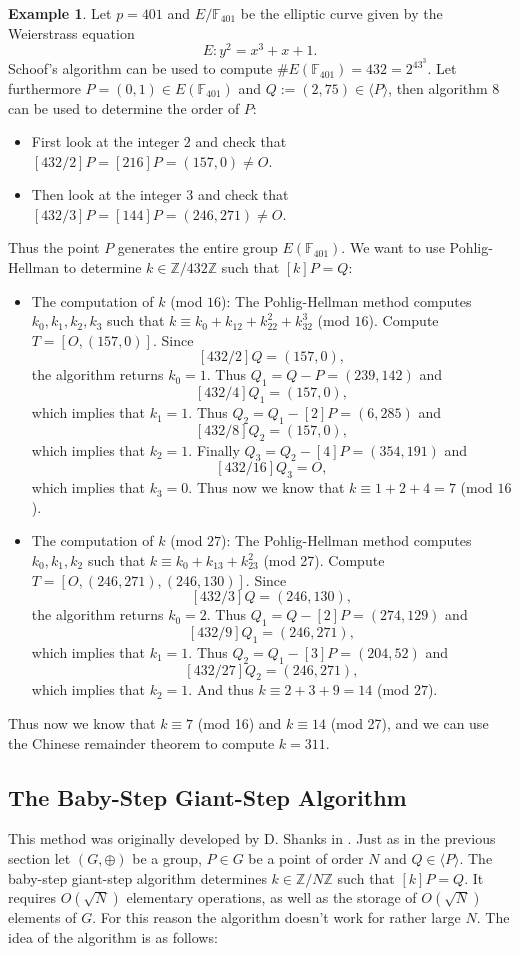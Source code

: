 \documentclass{article}
\numberwithin{equation}{section}
\theoremstyle{definition}
\newtheorem{example}[theorem]{Example}
\newcommand{\ZZ}{{\mathbb Z}} %
\newcommand{\Zmod}[1]{\ZZ / #1\ZZ} %
\newcommand{\FF}[1]{{\mathbb F}_{#1}} %
\newcommand{\grgen}[1]{\langle #1 \rangle} %
\begin{document}
\begin{example}
Let $p=401$ and $E/\FF{401}$ be the elliptic curve given by the Weierstrass equation $$E:y^2=x^3+x+1.$$ Schoof's algorithm can be used to compute $\#E(\FF{401}) = 432=2^43^3.$ Let furthermore $P=(0,1) \in E(\FF{401})$ and $Q:=(2,75) \in \grgen{P}$, then algorithm 8 can be used to determine the order of $P$:
\begin{itemize}
\item First look at the integer $2$ and check that $[432/2]P=[216]P=(157,0) \neq O$. 
\item Then look at the integer $3$ and check that $[432/3]P=[144]P=(246,271) \neq O$.
\end{itemize} 
Thus the point $P$ generates the entire group $E(\FF{401})$. We want to use Pohlig-Hellman to determine $k \in \Zmod{432}$ such that $[k]P=Q$: 
\begin{itemize}
\item The computation of $k$ (mod $16$): The Pohlig-Hellman method computes $k_0,k_1,k_2,k_3$ such that $k \equiv k_0+k_12+k_22^2+k_32^3$ (mod $16$). Compute $T=[O,(157,0)]$. Since $$[432/2]Q=(157,0),$$ the algorithm returns $k_0=1$. Thus $Q_1=Q-P=(239,142)$ and $$[432/4]Q_1=(157,0),$$ which implies that $k_1=1$. Thus $Q_2=Q_1-[2]P=(6,285)$ and $$[432/8]Q_2=(157,0),$$ which implies that $k_2=1$. Finally $Q_3=Q_2-[4]P=(354,191)$ and $$[432/16]Q_3=O,$$ which implies that $k_3=0$. Thus now we know that $k\equiv 1+2+4=7$ (mod $16$).
\item The computation of $k$ (mod $27$): The Pohlig-Hellman method computes $k_0,k_1,k_2$ such that $k\equiv k_0+k_13+k_23^2$ (mod 27). Compute $T=[O,(246,271),(246,130)]$. Since $$[432/3]Q=(246,130),$$ the algorithm returns $k_0=2$. Thus $Q_1=Q-[2]P = (274,129)$ and $$[432/9]Q_1=(246,271),$$ which implies that $k_1=1$. Thus $Q_2=Q_1-[3]P=(204,52)$ and $$[432/27]Q_2=(246,271),$$ which implies that $k_2=1$. And thus $k \equiv 2+3+9=14$ (mod $27$).
\end{itemize}
Thus now we know that $k\equiv 7$ (mod 16) and $k\equiv 14$ (mod 27), and we can use the Chinese remainder theorem to compute $k=311$.
\end{example} 




\subsection{The Baby-Step Giant-Step Algorithm}\label{babygiantstep}
This method was originally developed by D. Shanks in \cite{Shanks}. Just as in the previous section let $(G,\oplus)$ be a group, $P \in G$ be a point of order $N$ and $Q \in \grgen{P}$. The baby-step giant-step algorithm determines $k \in \Zmod{N}$ such that $[k]P=Q$. It requires $O(\sqrt{N})$ elementary operations, as well as the storage of $O(\sqrt{N})$ elements of $G$. For this reason the algorithm doesn't work for rather large $N$. The idea of the algorithm is as follows:
\end{document}
